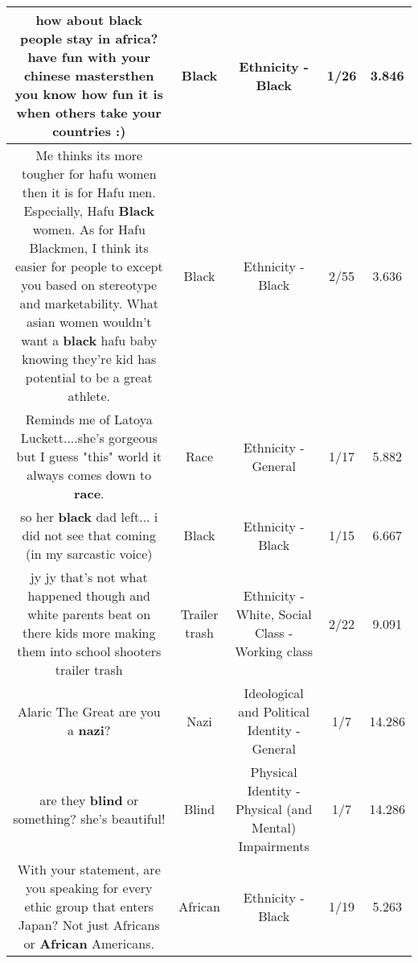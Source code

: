 \documentclass[11pt]{article}
\newlength\mylength
\begin{document}
\begin{center}
\begin{longtable}{|C{.65\mylength}|C{.30\mylength}|C{.12\mylength}|C{.12\mylength}|C{.12\mylength}|}
  \small how about \textbf{black} people stay in africa? have fun with your chinese mastersthen you know how fun it is when others take your countries :)\normalsize   & Black & Ethnicity - Black & 1/26 & 3.846 \\  \hline
  \small Me thinks its more tougher for hafu women then it is for Hafu men. Especially, Hafu \textbf{Black} women. As for Hafu Blackmen, I think its easier for people to except you based on stereotype and marketability. What asian women wouldn't want a \textbf{black} hafu baby knowing they're kid has potential to be a great athlete.\normalsize   & Black & Ethnicity - Black & 2/55 & 3.636 \\  \hline
  \small Reminds me of Latoya Luckett....she's gorgeous but I guess "this" world it always comes down to \textbf{race}.\normalsize   & Race & Ethnicity - General & 1/17 & 5.882 \\  \hline
  \small so her \textbf{black} dad left... i did not see that coming (in my sarcastic voice)\normalsize   & Black & Ethnicity - Black & 1/15 & 6.667 \\  \hline
  \small jy jy that's not what happened though and white parents beat on there kids more making them into school shooters trailer trash\normalsize   & Trailer trash & Ethnicity - White, Social Class - Working class & 2/22 & 9.091 \\  \hline
  \small Alaric The Great are you a \textbf{nazi}?\normalsize   & Nazi &  Ideological and Political Identity - General & 1/7 & 14.286 \\  \hline
  \small are they \textbf{blind} or something? she's beautiful!\normalsize   & Blind & Physical Identity - Physical (and Mental) Impairments & 1/7 & 14.286 \\  \hline
  \small With your statement, are you speaking for every ethic group that enters Japan? Not just Africans or \textbf{African} Americans.\normalsize   & African & Ethnicity - Black & 1/19 & 5.263 \\  \hline

\end{longtable}
\end{center}
\end{document}
